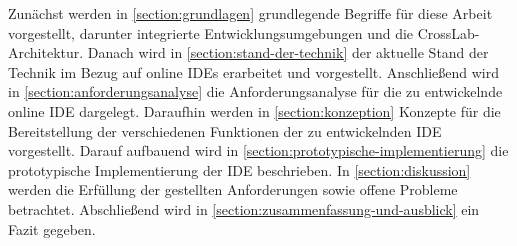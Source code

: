 Zunächst werden in \autoref{section:grundlagen} grundlegende Begriffe für diese Arbeit vorgestellt, darunter integrierte Entwicklungsumgebungen und die CrossLab-Architektur. Danach wird in \autoref{section:stand-der-technik} der aktuelle Stand der Technik im Bezug auf online IDEs erarbeitet und vorgestellt. Anschließend wird in \autoref{section:anforderungsanalyse} die Anforderungsanalyse für die zu entwickelnde online IDE dargelegt. Daraufhin werden in \autoref{section:konzeption} Konzepte für die Bereitstellung der verschiedenen Funktionen der zu entwickelnden IDE vorgestellt. Darauf aufbauend wird in \autoref{section:prototypische-implementierung} die prototypische Implementierung der IDE beschrieben. In \autoref{section:diskussion} werden die Erfüllung der gestellten Anforderungen sowie offene Probleme betrachtet. Abschließend wird in \autoref{section:zusammenfassung-und-ausblick} ein Fazit gegeben.
